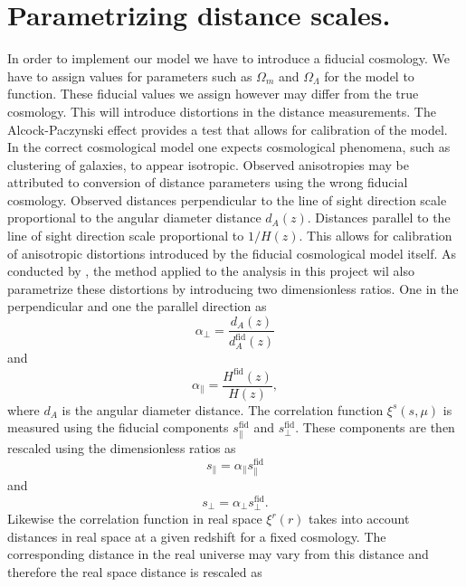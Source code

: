 \section{Parametrizing distance scales.}\label{sec:rescale_r}
In order to implement our model we have to introduce a fiducial cosmology. We have to assign values for parameters such as $\Omega_m$ and $\Omega_\Lambda$ for the model to function. These fiducial values we assign however may differ from the true cosmology. This will introduce distortions in the distance measurements. The Alcock-Paczynski effect\cite{Alcockpaczynski} provides a test that allows for calibration of the model. In the correct cosmological model one expects cosmological phenomena, such as clustering of galaxies, to appear isotropic. Observed anisotropies may be attributed to conversion of distance parameters using the wrong fiducial cosmology. Observed distances perpendicular to the line of sight direction scale proportional to the angular diameter distance $d_A(z)$. Distances parallel to the line of sight direction scale proportional to $1/H(z)$. This allows for calibration of anisotropic distortions introduced by the fiducial cosmological model itself. As conducted by \cite{BeyondBAO}, the method applied to the analysis in this project wil also parametrize these distortions by introducing two dimensionless ratios. One in the perpendicular and one the parallel direction as
\begin{equation}\label{eq:alpha_perp}
    \alpha_\perp=\frac{d_A(z)}{d_A^{\mathrm{fid}}(z)}
\end{equation} 
and
\begin{equation}\label{eq:alpha_par}
    \alpha_\parallel=\frac{H^{\mathrm{fid}}(z)}{H(z)},
\end{equation}
where $d_A$ is the angular diameter distance. The correlation function $\xi^s(s,\mu)$ is measured using the fiducial
components $s_\parallel^\mathrm{fid}$ and $s_\perp^\mathrm{fid}$. These components are then rescaled using the dimensionless ratios as
\begin{equation}
    s_\parallel=\alpha_\parallel s_\parallel^\mathrm{fid}
\end{equation}
and 
\begin{equation}
    s_\perp = \alpha_\perp s_\perp^\mathrm{fid}.
\end{equation}
Likewise the correlation function in real space $\xi^r(r)$ takes into account distances in real space at a given redshift for a fixed cosmology. The corresponding distance in the real universe may vary from this distance and therefore the real space distance is rescaled as
